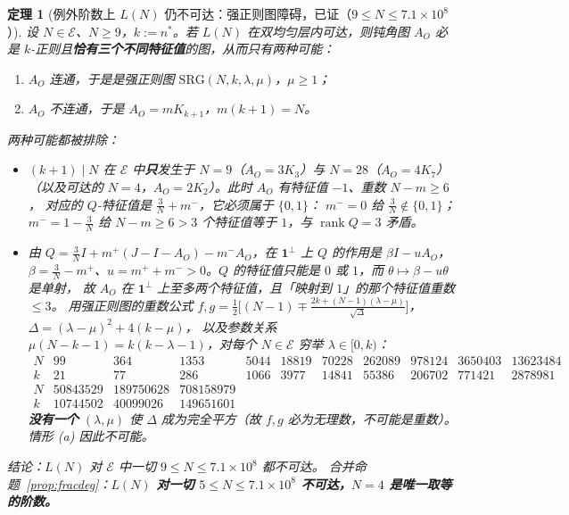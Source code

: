 \documentclass[UTF8,11pt]{ctexart}
\newtheorem{theorem}{定理}[section]
\theoremstyle{definition}
\newcommand{\rank}{\operatorname{rank}}
\newcommand{\one}{\mathbf{1}}
\begin{document}
\begin{theorem}[例外阶数上 $L(N)$ 仍不可达：强正则图障碍，已证（$9\le N\le7.1\times10^8$）]\label{thm:unattain}
设 $N\in\mathcal E$、$N\ge9$，$k:=n^*$。若 $L(N)$ 在双均匀层内可达，则钝角图 $A_O$ 必是
$k$-正则且\textbf{恰有三个不同特征值}的图，从而只有两种可能：
\begin{enumerate}[label=(\alph*),leftmargin=2.2em]
\item $A_O$ 连通，于是是强正则图 $\mathrm{SRG}(N,k,\lambda,\mu)$，$\mu\ge1$；
\item $A_O$ 不连通，于是 $A_O=mK_{k+1}$，$m(k+1)=N$。
\end{enumerate}
两种可能都被排除：
\begin{itemize}
\item[(b)] $(k+1)\mid N$ 在 $\mathcal E$ 中\textbf{只}发生于 $N=9$（$A_O=3K_3$）与 $N=28$（$A_O=4K_7$）
（以及可达的 $N=4$，$A_O=2K_2$）。此时 $A_O$ 有特征值 $-1$、重数 $N-m\ge6$，
对应的 $Q$-特征值是 $\frac3N+m^-$，它必须属于 $\{0,1\}$：
$m^-=0$ 给 $\frac3N\notin\{0,1\}$；$m^-=1-\frac3N$ 给 $N-m\ge6>3$ 个特征值等于 $1$，与 $\rank Q=3$ 矛盾。
\item[(a)] 由 $Q=\frac3NI+m^+(J-I-A_O)-m^-A_O$，在 $\one^\perp$ 上 $Q$ 的作用是 $\beta I-uA_O$，
$\beta=\frac3N-m^+$、$u=m^++m^->0$。$Q$ 的特征值只能是 $0$ 或 $1$，而 $\theta\mapsto\beta-u\theta$ 是\emph{单射}，
故 $A_O$ 在 $\one^\perp$ 上至多两个特征值，且「映射到 $1$」的那个特征值重数 $\le3$。
用强正则图的重数公式
$f,g=\frac12\bigl[(N-1)\mp\frac{2k+(N-1)(\lambda-\mu)}{\sqrt{\Delta}}\bigr]$，$\Delta=(\lambda-\mu)^2+4(k-\mu)$，
以及参数关系 $\mu(N-k-1)=k(k-\lambda-1)$，对每个 $N\in\mathcal E$ 穷举 $\lambda\in[0,k)$：
\[
\begin{array}{c|cccccccccc}
N&99&364&1353&5044&18819&70228&262089&978124&3650403&13623484\\
k&21&77&286&1066&3977&14841&55386&206702&771421&2878981\\
\hline
N&50843529&189750628&708158979&&&&&&&\\
k&10744502&40099026&149651601&&&&&&&
\end{array}
\]
\textbf{没有一个} $(\lambda,\mu)$ 使 $\Delta$ 成为完全平方（故 $f,g$ 必为无理数，不可能是重数）。
情形 (a) 因此不可能。
\end{itemize}
\emph{结论}：$L(N)$ 对 $\mathcal E$ 中一切 $9\le N\le7.1\times10^8$ 都不可达。
合并命题~\ref{prop:fracdeg}：\textbf{$L(N)$ 对一切 $5\le N\le7.1\times10^8$ 不可达，$N=4$ 是唯一取等的阶数。}
\end{theorem}
\end{document}

